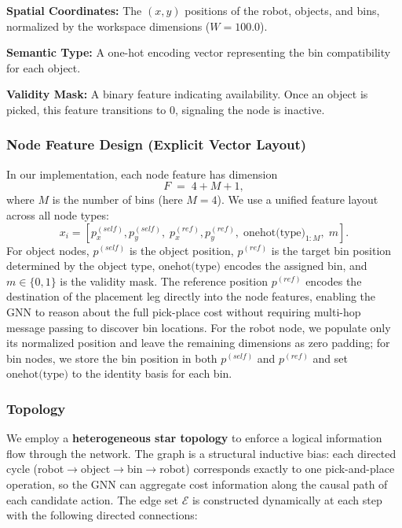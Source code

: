 \documentclass[conference]{IEEEtran}
\begin{document}
\textbf{Spatial Coordinates:} The $(x, y)$ positions of the robot, objects, and bins, normalized by the workspace dimensions ($W=100.0$).

\textbf{Semantic Type:} A one-hot encoding vector representing the bin compatibility for each object.

\textbf{Validity Mask:} A binary feature indicating availability. Once an object is picked, this feature transitions to $0$, signaling the node is inactive.

\subsubsection{Node Feature Design (Explicit Vector Layout)}
In our implementation, each node feature has dimension
\begin{equation}
F \;=\; 4 + M + 1,
\end{equation}
where $M$ is the number of bins (here $M=4$). 
We use a unified feature layout across all node types:
\begin{equation}
x_i = [p^{(self)}_x, p^{(self)}_y,\; p^{(ref)}_x, p^{(ref)}_y,\; \text{onehot(type)}_{1:M},\; m].
\end{equation}
For object nodes, $p^{(self)}$ is the object position, $p^{(ref)}$ is the target bin position determined by the object type, $\text{onehot(type)}$ encodes the assigned bin, and $m\in\{0,1\}$ is the validity mask. The reference position $p^{(ref)}$ encodes the destination of the placement leg directly into the node features, enabling the GNN to reason about the full pick-place cost without requiring multi-hop message passing to discover bin locations.
For the robot node, we populate only its normalized position and leave the remaining dimensions as zero padding; for bin nodes, we store the bin position in both $p^{(self)}$ and $p^{(ref)}$ and set $\text{onehot(type)}$ to the identity basis for each bin.

\subsubsection{Topology}
We employ a \textbf{heterogeneous star topology} to enforce a logical information flow through the network. The graph is a structural inductive bias: each directed cycle (robot$\to$object$\to$bin$\to$robot) corresponds exactly to one pick-and-place operation, so the GNN can aggregate cost information along the causal path of each candidate action. The edge set $\mathcal{E}$ is constructed dynamically at each step with the following directed connections:
\end{document}
